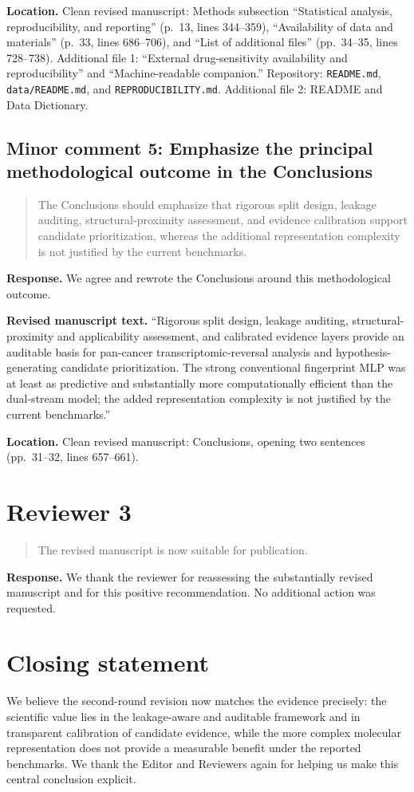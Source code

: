 \documentclass[10pt]{article}
\newenvironment{reviewcomment}{%
  \begin{quote}\small\itshape\color{black}
}{\end{quote}}
\newcommand{\Response}{\textbf{Response.} }
\newcommand{\RevisedText}{\textbf{Revised manuscript text.} }
\newcommand{\Location}{\textbf{Location.} }
\newcommand{\qtext}[1]{``#1''}
\begin{document}
\Location Clean revised manuscript: Methods subsection ``Statistical analysis, reproducibility, and reporting'' (p.~13, lines 344--359), ``Availability of data and materials'' (p.~33, lines 686--706), and ``List of additional files'' (pp.~34--35, lines 728--738). Additional file 1: ``External drug-sensitivity availability and reproducibility'' and ``Machine-readable companion.'' Repository: \texttt{README.md}, \texttt{data/README.md}, and \texttt{REPRODUCIBILITY.md}. Additional file 2: README and Data Dictionary.

\subsection*{Minor comment 5: Emphasize the principal methodological outcome in the Conclusions}

\begin{reviewcomment}
The Conclusions should emphasize that rigorous split design, leakage auditing, structural-proximity assessment, and evidence calibration support candidate prioritization, whereas the additional representation complexity is not justified by the current benchmarks.
\end{reviewcomment}

\Response We agree and rewrote the Conclusions around this methodological outcome.

\RevisedText \qtext{Rigorous split design, leakage auditing, structural-proximity and applicability assessment, and calibrated evidence layers provide an auditable basis for pan-cancer transcriptomic-reversal analysis and hypothesis-generating candidate prioritization. The strong conventional fingerprint MLP was at least as predictive and substantially more computationally efficient than the dual-stream model; the added representation complexity is not justified by the current benchmarks.}

\Location Clean revised manuscript: Conclusions, opening two sentences (pp.~31--32, lines 657--661).

\clearpage
\section*{Reviewer 3}

\begin{reviewcomment}
The revised manuscript is now suitable for publication.
\end{reviewcomment}

\Response We thank the reviewer for reassessing the substantially revised manuscript and for this positive recommendation. No additional action was requested.

\section*{Closing statement}

We believe the second-round revision now matches the evidence precisely: the scientific value lies in the leakage-aware and auditable framework and in transparent calibration of candidate evidence, while the more complex molecular representation does not provide a measurable benefit under the reported benchmarks. We thank the Editor and Reviewers again for helping us make this central conclusion explicit.
\end{document}
